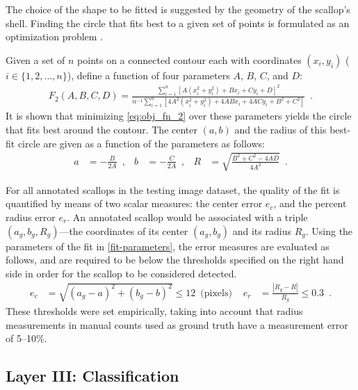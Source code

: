 \documentclass {udthesis}
\begin{document}
The choice of the
shape to be fitted is suggested by the geometry of the scallop's shell.
Finding the circle that fits best to a given set of points is formulated as
an optimization problem \cite{taubin,chernov}.

Given a set of $n$ points on a connected contour each with coordinates $(x_i,y_i)$ ($i\in\{1,2,\ldots,n\}$), 
define a  function of four parameters $A$, $B$, $C$, and $D$:
\begin{align} \label{eq:obj_fn_2}
 F_2(A,B,C,D) = \frac{\sum_{i=1}^{n} [A(x_i^2+y_i^2)+Bx_i+Cy_i+D]^2}{n^{-1}\sum_{i=1}^{n} [4A^2(x_i^2+y_i^2)+4ABx_i+4ACy_i+B^2+C^2]} \enspace.
\end{align}
It is shown \cite{taubin} that minimizing \eqref{eq:obj_fn_2} over these parameters yields the circle that fits best around the contour.
The center $(a,b)$ and the radius of this best-fit circle are given as a function of
the parameters as follows:
%
\begin{align} \label{fit-parameters}
a&=-\frac{B}{2A}\enspace,&  b&=-\frac{C}{2A} \enspace, &
R&=\sqrt{\frac{B^2+C^2-4AD}{4A^2}}  \enspace.
\end{align} 

For all annotated scallops in the testing image dataset, the quality of the fit is quantified by means of two scalar measures:
the center error $e_c$, and the percent radius error $e_r$.
An annotated scallop would be associated with a triple 
$(a_g, b_g,R_g)$---the coordinates of its center $(a_g,b_g)$ and its radius $R_g$.
Using the parameters of the fit in \eqref{fit-parameters}, the error measures are evaluated as follows, and are required to be below the thresholds specified on the right hand side in order for the scallop to be considered detected.
%
\begin{align*}	%
      e_c &= \sqrt{(a_g-a)^2 + (b_g-b)^2}\leq12 \enspace  \text{(pixels) } & 
      e_r &= \frac{| R_g - R |}{R_g} \leq0.3   \enspace.
\end{align*}
%
These thresholds were
set empirically, taking into account that radius measurements
in manual counts  used as ground truth \cite{walker} have a measurement error of 5--10\%. 



\subsection{Layer III: Classification} \label{subsec:layer3}
\end{document}
